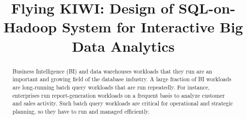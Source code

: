 \documentclass[conference]{IEEEtran}
\begin{document}
    \title{Flying KIWI: Design of SQL-on-Hadoop System for Interactive Big Data Analytics}

    \author{
 }

\maketitle

\begin{abstract}
Business Intelligence (BI) and data warehouses workloads that they run are an important and growing field of the database industry.
A large fraction of BI workloads are long-running batch query workloads that are run repeatedly.
For instance, enterprises run report-generation workloads on a frequent basis to analyze customer and sales activity.
Such batch query workloads are critical for operational and strategic planning, so they have to run and managed efficiently.
\end{abstract}
\end{document}
